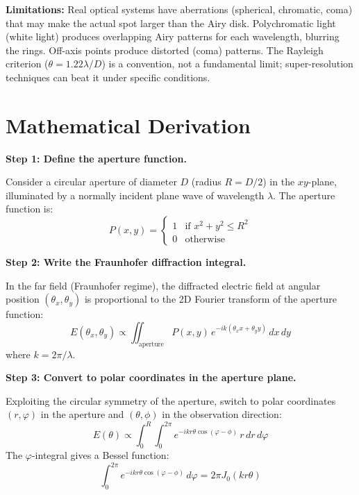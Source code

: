 \textbf{Limitations:} Real optical systems have aberrations (spherical, chromatic, coma) that may make the actual spot larger than the Airy disk. Polychromatic light (white light) produces overlapping Airy patterns for each wavelength, blurring the rings. Off-axis points produce distorted (coma) patterns. The Rayleigh criterion ($\theta = 1.22\lambda/D$) is a convention, not a fundamental limit; super-resolution techniques can beat it under specific conditions.


\section*{Mathematical Derivation}

\textbf{Step 1: Define the aperture function.}

Consider a circular aperture of diameter $D$ (radius $R = D/2$) in the $xy$-plane, illuminated by a normally incident plane wave of wavelength $\lambda$. The aperture function is:
\begin{equation}
P(x,y) = \begin{cases} 1 & \text{if } x^2 + y^2 \leq R^2 \\ 0 & \text{otherwise} \end{cases}
\end{equation}

\textbf{Step 2: Write the Fraunhofer diffraction integral.}

In the far field (Fraunhofer regime), the diffracted electric field at angular position $(\theta_x, \theta_y)$ is proportional to the 2D Fourier transform of the aperture function:
\begin{equation}
E(\theta_x, \theta_y) \propto \iint_{\text{aperture}} P(x,y)\,e^{-i k(\theta_x x + \theta_y y)}\,dx\,dy
\end{equation}
where $k = 2\pi/\lambda$.

\textbf{Step 3: Convert to polar coordinates in the aperture plane.}

Exploiting the circular symmetry of the aperture, switch to polar coordinates $(r,\varphi)$ in the aperture and $(\theta,\phi)$ in the observation direction:
\begin{equation}
E(\theta) \propto \int_0^R \int_0^{2\pi} e^{-ikr\theta\cos(\varphi-\phi)}\,r\,dr\,d\varphi
\end{equation}
The $\varphi$-integral gives a Bessel function:
\begin{equation}
\int_0^{2\pi} e^{-ikr\theta\cos(\varphi-\phi)}\,d\varphi = 2\pi J_0(kr\theta)
\end{equation}

